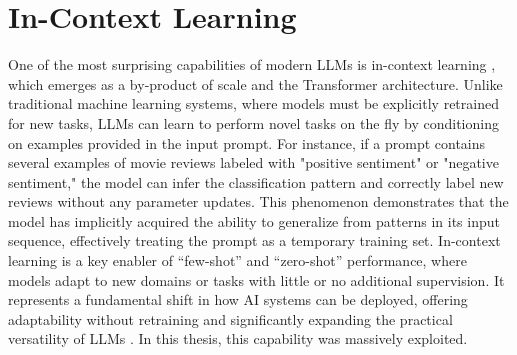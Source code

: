 \section{In-Context Learning}
One of the most surprising capabilities of modern LLMs is in-context learning \cite{zhao2025incontextlearningsufficientinstruction}, which emerges as a by-product of scale and the Transformer architecture. Unlike traditional machine learning systems, where models must be explicitly retrained for new tasks, LLMs can learn to perform novel tasks on the fly by conditioning on examples provided in the input prompt. For instance, if a prompt contains several examples of movie reviews labeled with "positive sentiment" or "negative sentiment," the model can infer the classification pattern and correctly label new reviews without any parameter updates. This phenomenon demonstrates that the model has implicitly acquired the ability to generalize from patterns in its input sequence, effectively treating the prompt as a temporary training set. In-context learning is a key enabler of “few-shot” and “zero-shot” performance, where models adapt to new domains or tasks with little or no additional supervision. It represents a fundamental shift in how AI systems can be deployed, offering adaptability without retraining and significantly expanding the practical versatility of LLMs \cite{han2023incontext, ibm2021incontext, googleresearch2023icl}.
In this thesis, this capability was massively exploited.